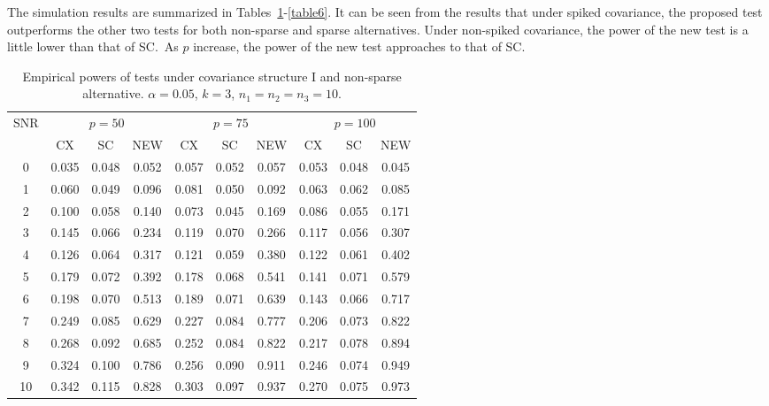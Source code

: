 \documentclass[12pt]{article} %
\DeclareMathOperator{\mytr}{tr}
\newcommand{\bfsym}[1]{\ensuremath{\boldsymbol{#1}}}
\def\bSigma {\bfsym {\Sigma}}
\theoremstyle{definition}
\begin{document}
The simulation results are summarized in Tables~\ref{table1}-\ref{table6}. It can be seen from the results that under spiked covariance, the proposed test outperforms the other two tests for both non-sparse and sparse alternatives.
Under non-spiked covariance, the power of the new test is a little lower than that of SC.\ 
As $p$ increase, the power of the new test approaches to that of SC.



\begin{table}[!hbp]
    \caption{Empirical powers of tests under covariance structure I and non-sparse alternative. $\alpha=0.05$, $k=3$, $n_1=n_2=n_3=10$. }
    \label{table1}
    \centering
    \begin{tabular}{*{10}{c}}
    \toprule
    \multirow{2}{*}{SNR} &\multicolumn{3}{c}{$p=50$}&\multicolumn{3}{c}{$p=75$}&\multicolumn{3}{c}{$p=100$} \\
        \cmidrule(r){2-4}\cmidrule(r){5-7}\cmidrule(r){8-10}
        & CX & SC & NEW & CX &SC &NEW &CX & SC & NEW\\
    \midrule
0 & 0.035 & 0.048 & 0.052 & 0.057 & 0.052 & 0.057 & 0.053 & 0.048 & 0.045 \\ 
1 & 0.060 & 0.049 & 0.096 & 0.081 & 0.050 & 0.092 & 0.063 & 0.062 & 0.085 \\ 
2 & 0.100 & 0.058 & 0.140 & 0.073 & 0.045 & 0.169 & 0.086 & 0.055 & 0.171 \\ 
3 & 0.145 & 0.066 & 0.234 & 0.119 & 0.070 & 0.266 & 0.117 & 0.056 & 0.307 \\ 
4 & 0.126 & 0.064 & 0.317 & 0.121 & 0.059 & 0.380 & 0.122 & 0.061 & 0.402 \\ 
5 & 0.179 & 0.072 & 0.392 & 0.178 & 0.068 & 0.541 & 0.141 & 0.071 & 0.579 \\ 
6 & 0.198 & 0.070 & 0.513 & 0.189 & 0.071 & 0.639 & 0.143 & 0.066 & 0.717 \\ 
7 & 0.249 & 0.085 & 0.629 & 0.227 & 0.084 & 0.777 & 0.206 & 0.073 & 0.822 \\ 
8 & 0.268 & 0.092 & 0.685 & 0.252 & 0.084 & 0.822 & 0.217 & 0.078 & 0.894 \\ 
9 & 0.324 & 0.100 & 0.786 & 0.256 & 0.090 & 0.911 & 0.246 & 0.074 & 0.949 \\ 
10 & 0.342 & 0.115 & 0.828 & 0.303 & 0.097 & 0.937 & 0.270 & 0.075 & 0.973 \\ 
\bottomrule
\end{tabular}
\end{table}
\end{document}
